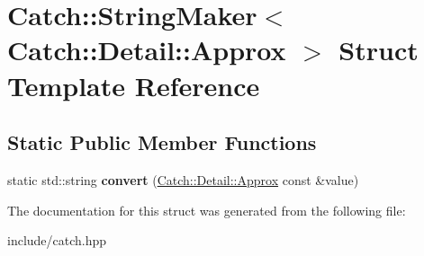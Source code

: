 \hypertarget{structCatch_1_1StringMaker_3_01Catch_1_1Detail_1_1Approx_01_4}{}\section{Catch\+:\+:String\+Maker$<$ Catch\+:\+:Detail\+:\+:Approx $>$ Struct Template Reference}
\label{structCatch_1_1StringMaker_3_01Catch_1_1Detail_1_1Approx_01_4}
\subsection*{Static Public Member Functions}
\begin{DoxyCompactItemize}
\item 
static std\+::string {\bfseries convert} (\hyperlink{classCatch_1_1Detail_1_1Approx}{Catch\+::\+Detail\+::\+Approx} const \&value)\hypertarget{structCatch_1_1StringMaker_3_01Catch_1_1Detail_1_1Approx_01_4_a8e5015720682fecfbff0f05de19a698f}{}\label{structCatch_1_1StringMaker_3_01Catch_1_1Detail_1_1Approx_01_4_a8e5015720682fecfbff0f05de19a698f}

\end{DoxyCompactItemize}


The documentation for this struct was generated from the following file\+:\begin{DoxyCompactItemize}
\item 
include/catch.\+hpp\end{DoxyCompactItemize}
